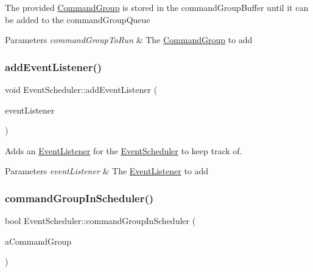 The provided \mbox{\hyperlink{classlib_iterative_robot_1_1_command_group}{Command\+Group}} is stored in the command\+Group\+Buffer until it can be added to the command\+Group\+Queue


\begin{DoxyParams}{Parameters}
{\em command\+Group\+To\+Run} & The \mbox{\hyperlink{classlib_iterative_robot_1_1_command_group}{Command\+Group}} to add \\
\hline
\end{DoxyParams}
\mbox{\label{classlib_iterative_robot_1_1_event_scheduler_ad6e214ce9686a58eb37fb71796531b4e}} 
\subsubsection{\texorpdfstring{addEventListener()}{addEventListener()}}
{\footnotesize\ttfamily void Event\+Scheduler\+::add\+Event\+Listener (\begin{DoxyParamCaption}\item[{\mbox{\hyperlink{classlib_iterative_robot_1_1_event_listener}{Event\+Listener}} $\ast$}]{event\+Listener }\end{DoxyParamCaption})}



Adds an \mbox{\hyperlink{classlib_iterative_robot_1_1_event_listener}{Event\+Listener}} for the \mbox{\hyperlink{classlib_iterative_robot_1_1_event_scheduler}{Event\+Scheduler}} to keep track of. 


\begin{DoxyParams}{Parameters}
{\em event\+Listener} & The \mbox{\hyperlink{classlib_iterative_robot_1_1_event_listener}{Event\+Listener}} to add \\
\hline
\end{DoxyParams}
\mbox{\label{classlib_iterative_robot_1_1_event_scheduler_af47242d40b09df43698bb00cbe4f9300}} 
\subsubsection{\texorpdfstring{commandGroupInScheduler()}{commandGroupInScheduler()}}
{\footnotesize\ttfamily bool Event\+Scheduler\+::command\+Group\+In\+Scheduler (\begin{DoxyParamCaption}\item[{\mbox{\hyperlink{classlib_iterative_robot_1_1_command_group}{Command\+Group}} $\ast$}]{a\+Command\+Group }\end{DoxyParamCaption})\hspace{0.3cm}{\ttfamily [private]}}



